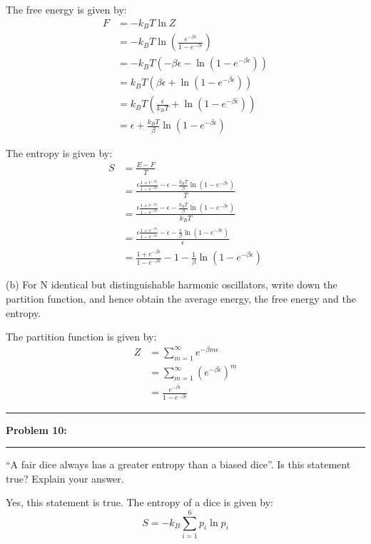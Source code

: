 \documentclass[11pt]{article}
\newcommand\question[2]{\vspace{.25in}\hrule\textbf{#1: #2}\vspace{.5em}\hrule\vspace{.10in}}
\begin{document}
The free energy is given by:
\begin{align*}
    F &= -k_BT\ln Z\\
      &= -k_BT\ln\left(\frac{e^{-\beta\epsilon}}{1-e^{-\beta\epsilon}}\right)\\
      &= -k_BT\left(-\beta\epsilon-\ln(1-e^{-\beta\epsilon})\right)\\
      &= k_BT\left(\beta\epsilon+\ln(1-e^{-\beta\epsilon})\right)\\
      &= k_BT\left(\frac{\epsilon}{k_BT}+\ln(1-e^{-\beta\epsilon})\right)\\
      &= \epsilon+\frac{k_BT}{\beta}\ln(1-e^{-\beta\epsilon})
\end{align*}

The entropy is given by:
\begin{align*}
    S &= \frac{E-F}{T}\\
      &= \frac{\epsilon\frac{1+e^{-\beta\epsilon}}{1-e^{-\beta\epsilon}}-\epsilon-\frac{k_BT}{\beta}\ln(1-e^{-\beta\epsilon})}{T}\\
      &= \frac{\epsilon\frac{1+e^{-\beta\epsilon}}{1-e^{-\beta\epsilon}}-\epsilon-\frac{k_BT}{\beta}\ln(1-e^{-\beta\epsilon})}{k_BT}\\
      &= \frac{\epsilon\frac{1+e^{-\beta\epsilon}}{1-e^{-\beta\epsilon}}-\epsilon-\frac{\epsilon}{\beta}\ln(1-e^{-\beta\epsilon})}{\epsilon}\\
      &= \frac{1+e^{-\beta\epsilon}}{1-e^{-\beta\epsilon}}-1-\frac{1}{\beta}\ln(1-e^{-\beta\epsilon})
\end{align*}

(b) For N identical but distinguishable harmonic oscillators, write down the partition function, and hence obtain the average energy, the free energy and the entropy.

\solution

The partition function is given by:
\begin{align*}
    Z &= \sum_{m=1}^\infty e^{-\beta m\epsilon}\\
      &= \sum_{m=1}^\infty\left(e^{-\beta\epsilon}\right)^m\\
      &= \frac{e^{-\beta\epsilon}}{1-e^{-\beta\epsilon}}
\end{align*}

\question{Problem 10}{}
“A fair dice always has a greater entropy than a biased dice”. Is this statement true? Explain your answer.

\solution

Yes, this statement is true. The entropy of a dice is given by:
\begin{equation}
    S=-k_B\sum_{i=1}^6p_i\ln p_i
\end{equation}
\end{document}
